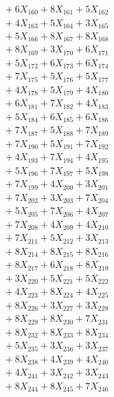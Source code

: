\documentclass[a4paper,10pt]{article}
\begin{document}
{\begin{align}
&\;  + 6 X_{160} + 8 X_{161} + 5 X_{162} \\[0.3ex]
&\;  + 4 X_{163} + 5 X_{164} + 3 X_{165} \\[0.3ex]
&\;  + 5 X_{166} + 8 X_{167} + 8 X_{168} \\[0.3ex]
&\;  + 8 X_{169} + 3 X_{170} + 6 X_{171} \\[0.3ex]
&\;  + 5 X_{172} + 6 X_{173} + 6 X_{174} \\[0.3ex]
&\;  + 7 X_{175} + 5 X_{176} + 5 X_{177} \\[0.3ex]
&\;  + 4 X_{178} + 5 X_{179} + 4 X_{180} \\[0.3ex]
&\;  + 6 X_{181} + 7 X_{182} + 4 X_{183} \\[0.3ex]
&\;  + 5 X_{184} + 6 X_{185} + 6 X_{186} \\[0.3ex]
&\;  + 7 X_{187} + 5 X_{188} + 7 X_{189} \\[0.5ex]\allowbreak
&\;  + 7 X_{190} + 5 X_{191} + 7 X_{192} \\[0.3ex]
&\;  + 4 X_{193} + 7 X_{194} + 4 X_{195} \\[0.3ex]
&\;  + 5 X_{196} + 7 X_{197} + 5 X_{198} \\[0.3ex]
&\;  + 7 X_{199} + 4 X_{200} + 3 X_{201} \\[0.3ex]
&\;  + 7 X_{202} + 3 X_{203} + 7 X_{204} \\[0.3ex]
&\;  + 5 X_{205} + 7 X_{206} + 4 X_{207} \\[0.3ex]
&\;  + 7 X_{208} + 4 X_{209} + 4 X_{210} \\[0.3ex]
&\;  + 7 X_{211} + 5 X_{212} + 3 X_{213} \\[0.3ex]
&\;  + 8 X_{214} + 8 X_{215} + 8 X_{216} \\[0.3ex]
&\;  + 8 X_{217} + 6 X_{218} + 8 X_{219} \\[0.5ex]\allowbreak
&\;  + 3 X_{220} + 5 X_{221} + 5 X_{222} \\[0.3ex]
&\;  + 4 X_{223} + 8 X_{224} + 4 X_{225} \\[0.3ex]
&\;  + 8 X_{226} + 3 X_{227} + 3 X_{228} \\[0.3ex]
&\;  + 8 X_{229} + 8 X_{230} + 7 X_{231} \\[0.3ex]
&\;  + 8 X_{232} + 8 X_{233} + 8 X_{234} \\[0.3ex]
&\;  + 5 X_{235} + 3 X_{236} + 3 X_{237} \\[0.3ex]
&\;  + 8 X_{238} + 4 X_{239} + 4 X_{240} \\[0.3ex]
&\;  + 4 X_{241} + 3 X_{242} + 3 X_{243} \\[0.3ex]
&\;  + 8 X_{244} + 8 X_{245} + 7 X_{246} \\[0.3ex]

\end{align}}
\end{document}

